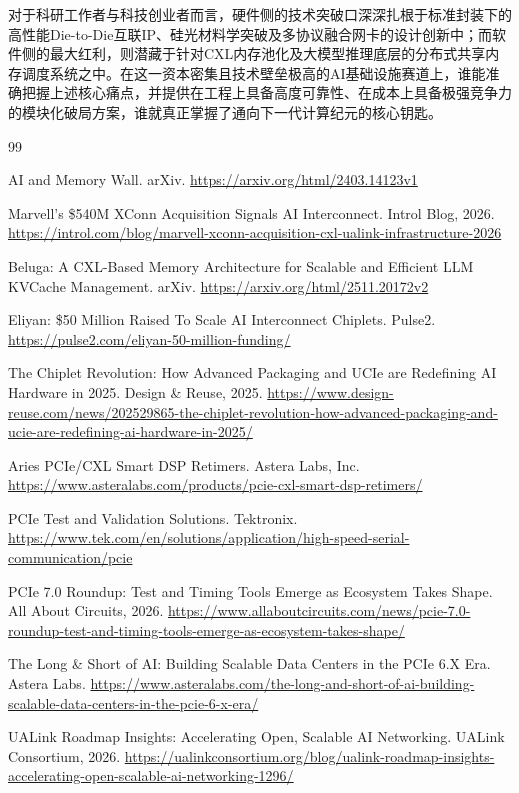 对于科研工作者与科技创业者而言，硬件侧的技术突破口深深扎根于标准封装下的高性能Die-to-Die互联IP、硅光材料学突破及多协议融合网卡的设计创新中；而软件侧的最大红利，则潜藏于针对CXL内存池化及大模型推理底层的分布式共享内存调度系统之中。在这一资本密集且技术壁垒极高的AI基础设施赛道上，谁能准确把握上述核心痛点，并提供在工程上具备高度可靠性、在成本上具备极强竞争力的模块化破局方案，谁就真正掌握了通向下一代计算纪元的核心钥匙。

\begin{thebibliography}{99}

 AI and Memory Wall. arXiv. \url{https://arxiv.org/html/2403.14123v1}

 Marvell's \$540M XConn Acquisition Signals AI Interconnect. Introl Blog, 2026. \url{https://introl.com/blog/marvell-xconn-acquisition-cxl-ualink-infrastructure-2026}

 Beluga: A CXL-Based Memory Architecture for Scalable and Efficient LLM KVCache Management. arXiv. \url{https://arxiv.org/html/2511.20172v2}

 Eliyan: \$50 Million Raised To Scale AI Interconnect Chiplets. Pulse2. \url{https://pulse2.com/eliyan-50-million-funding/}

 The Chiplet Revolution: How Advanced Packaging and UCIe are Redefining AI Hardware in 2025. Design \& Reuse, 2025. \url{https://www.design-reuse.com/news/202529865-the-chiplet-revolution-how-advanced-packaging-and-ucie-are-redefining-ai-hardware-in-2025/}

 Aries PCIe/CXL Smart DSP Retimers. Astera Labs, Inc. \url{https://www.asteralabs.com/products/pcie-cxl-smart-dsp-retimers/}

 PCIe Test and Validation Solutions. Tektronix. \url{https://www.tek.com/en/solutions/application/high-speed-serial-communication/pcie}

 PCIe 7.0 Roundup: Test and Timing Tools Emerge as Ecosystem Takes Shape. All About Circuits, 2026. \url{https://www.allaboutcircuits.com/news/pcie-7.0-roundup-test-and-timing-tools-emerge-as-ecosystem-takes-shape/}

 The Long \& Short of AI: Building Scalable Data Centers in the PCIe 6.X Era. Astera Labs. \url{https://www.asteralabs.com/the-long-and-short-of-ai-building-scalable-data-centers-in-the-pcie-6-x-era/}

 UALink Roadmap Insights: Accelerating Open, Scalable AI Networking. UALink Consortium, 2026. \url{https://ualinkconsortium.org/blog/ualink-roadmap-insights-accelerating-open-scalable-ai-networking-1296/}


\end{thebibliography}
